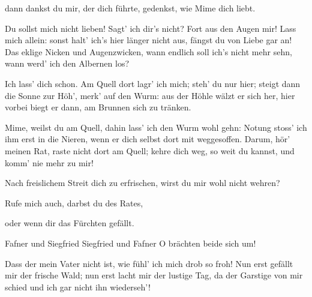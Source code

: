\begin{drama}

dann dankst du mir, der dich führte,
gedenkst, wie Mime dich liebt.

\Siegfriedspeaks

Du sollst mich nicht lieben!
Sagt' ich dir's nicht?
Fort aus den Augen mir!
Lass mich allein:
sonst halt' ich's hier länger nicht aus,
fängst du von Liebe gar an!
Das eklige Nicken
und Augenzwicken,
wann endlich soll ich's
nicht mehr sehn,
wann werd' ich den Albernen los?

\Mimespeaks

Ich lass' dich schon.
Am Quell dort lagr' ich mich;
steh' du nur hier;
steigt dann die Sonne zur Höh',
merk' auf den Wurm:
aus der Höhle wälzt er sich her,
hier vorbei
biegt er dann,
am Brunnen sich zu tränken.

\Siegfriedspeaks


Mime, weilst du am Quell,
dahin lass' ich den Wurm wohl gehn:
Notung stoss' ich
ihm erst in die Nieren,
wenn er dich selbst dort
mit weggesoffen.
Darum, hör' meinen Rat,
raste nicht dort am Quell;
kehre dich weg,
so weit du kannst,
und komm' nie mehr zu mir!

\Mimespeaks

Nach freislichem Streit
dich zu erfrischen,
wirst du mir wohl nicht wehren?


Rufe mich auch,
darbst du des Rates,


oder wenn dir das Fürchten gefällt.



Fafner und Siegfried
Siegfried und Fafner
O brächten beide sich um!


\Siegfriedspeaks


Dass der mein Vater nicht ist,
wie fühl' ich mich drob so froh!
Nun erst gefällt mir
der frische Wald;
nun erst lacht mir
der lustige Tag,
da der Garstige von mir schied
und ich gar nicht ihn wiederseh'!



\end{drama}
